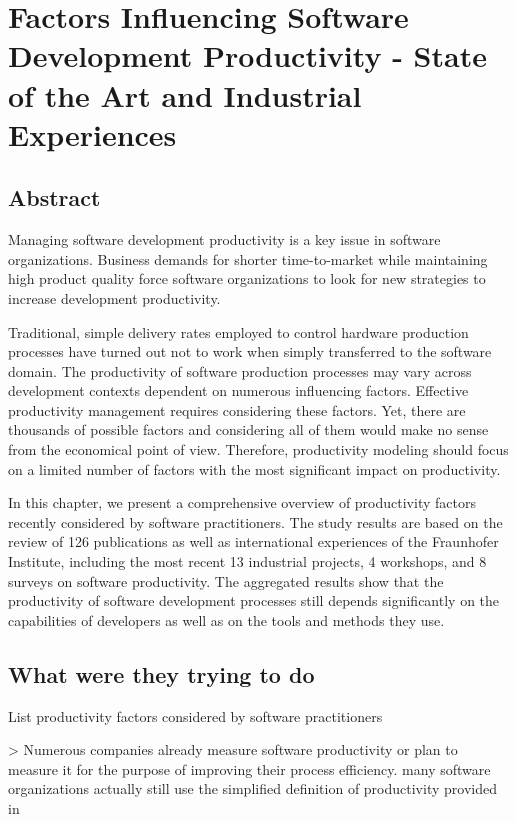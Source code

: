 \section{Factors Influencing Software Development Productivity - State of the Art and Industrial Experiences}

\subsection{Abstract}

Managing software development productivity is a key issue in software organizations. Business demands for shorter time-to-market while maintaining high product quality force software organizations to look for new strategies to increase development productivity.

Traditional, simple delivery rates employed to control hardware production processes have turned out not to work when simply transferred to the software domain. The productivity of software production processes may vary across development contexts dependent on numerous influencing factors. Effective productivity management requires considering these factors. Yet, there are thousands of possible factors and considering all of them would make no sense from the economical point of view. Therefore, productivity modeling should focus on a limited number of factors with the most significant impact on productivity.

In this chapter, we present a comprehensive overview of productivity factors recently considered by software practitioners. The study results are based on the review of 126 publications as well as international experiences of the Fraunhofer Institute, including the most recent 13 industrial projects, 4 workshops, and 8 surveys on software productivity. The aggregated results show that the productivity of software development processes still depends significantly on the capabilities of developers as well as on the tools and methods they use.

\subsection{What were they trying to do}

List productivity factors considered by software practitioners

> Numerous companies already measure software productivity \cite{devanbuAnalyticalEmpiricalEvaluation1996} or plan to measure it for the purpose of improving their process efficiency. many software organizations actually still use the simplified definition of productivity provided in \cite{careyImpactCommunicationMode1997}

